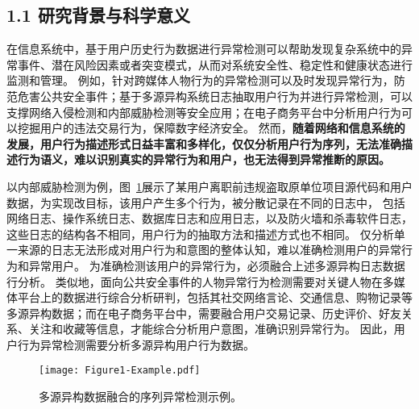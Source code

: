\subsection{\sihao \songti \bfseries 1.1 研究背景与科学意义}

在信息系统中，基于用户历史行为数据进行异常检测可以帮助发现复杂系统中的异常事件、潜在风险因素或者突变模式，从而对系统安全性、稳定性和健康状态进行监测和管理。
例如，针对跨媒体人物行为的异常检测可以及时发现异常行为，防范危害公共安全事件；基于多源异构系统日志抽取用户行为并进行异常检测，可以支撑网络入侵检测和内部威胁检测等安全应用；在电子商务平台中分析用户行为可以挖掘用户的违法交易行为，保障数字经济安全。
然而，\textbf{\songti 随着网络和信息系统的发展，用户行为描述形式日益丰富和多样化，仅仅分析用户行为序列，无法准确描述行为语义，难以识别真实的异常行为和用户，也无法得到异常推断的原因。}

以内部威胁检测为例，图~\ref{fig:example}展示了某用户离职前违规盗取原单位项目源代码和用户数据，为实现改目标，该用户产生多个行为，被分散记录在不同的日志中，
包括网络日志、操作系统日志、数据库日志和应用日志，以及防火墙和杀毒软件日志，这些日志的结构各不相同，用户行为的抽取方法和描述方式也不相同。
仅分析单一来源的日志无法形成对用户行为和意图的整体认知，难以准确检测用户的异常行为和异常用户。
为准确检测该用户的异常行为，必须融合上述多源异构日志数据行分析。
类似地，面向公共安全事件的人物异常行为检测需要对关键人物在多媒体平台上的数据进行综合分析研判，包括其社交网络言论、交通信息、购物记录等多源异构数据；而在电子商务平台中，需要融合用户交易记录、历史评价、好友关系、关注和收藏等信息，才能综合分析用户意图，准确识别异常行为。
因此，用户行为异常检测需要分析多源异构用户行为数据。

\begin{figure}[htp]
    \centering
    \texttt{[image: Figure1-Example.pdf]}
    \caption{多源异构数据融合的序列异常检测示例。}
    \label{fig:example}
\end{figure}

